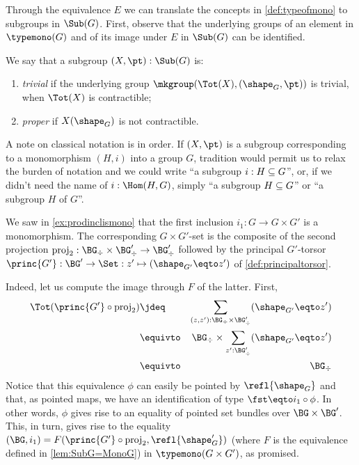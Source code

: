 Through the equivalence $E$ we can translate the concepts in
\cref{def:typeofmono} to subgroups in $\Sub(G)$.  First, observe that the
underlying groups of an element in $\typemono(G)$ and of its image under $E$ in
$\Sub(G)$ can be identified.

\begin{definition}\label{def:triv-proper-Mono}
We say that a subgroup $(X,\pt):\Sub(G)$ is:
\begin{enumerate}
\item \emph{trivial} if the underlying group
  $\mkgroup(\Tot(X),(\sh_G,\pt))$ is trivial, \ie when $\Tot(X)$ is contractible;
\item \emph{proper} if $X(\sh_G)$ is not
  contractible.\qedhere
\end{enumerate}
\end{definition}
      
\begin{remark}\label{rem:notationsubgroup}
  A note on classical notation is in order.  If $(X,\pt)$ is a subgroup
  corresponding to a monomorphism $(H,i)$ into a group $G$, tradition would
  permit us to relax the burden of notation and we could write ``a subgroup
  $i:H\subseteq G$'', or, if we didn't need the name of $i:\Hom(H,G)$, simply
  ``a subgroup $H\subseteq G$'' or ``a subgroup $H$ of $G$''.
    \end{remark}
    
\begin{example}
  \label{ex:prodinclisGset}
  We saw in \cref{ex:prodinclismono} that the first 
  inclusion $i_1:G\to G\times G'$ is a monomorphism.
  The corresponding $G\times G'$-set is the composite of the second projection
  $\mathrm{proj}_2:\BG_\div\times\BG'_\div\to \BG'_\div$ followed by the
  principal $G'$-torsor $\princ {G'}:\BG'\to\Set: z'\mapsto (\sh_{G'}\eqto z')$ 
  of \cref{def:principaltorsor}.

  Indeed, let us compute the image through $F$ of the latter. First,
  \begin{eqnarray*}
    \Tot(\princ {G'}\circ \mathrm{proj}_2)
    & \jdeq & \sum_{(z,z') : \BG_\div\times\BG'_\div}(\sh_{G'}\eqto z') \\
    & \equivto & \BG_\div \times \sum_{z' : \BG'_\div}(\sh_{G'}\eqto z') \\
    & \equivto & \BG_\div
  \end{eqnarray*}
  Notice that this equivalence $\phi$ can easily be pointed by $\refl{\sh_G}$
  and that, as pointed maps, we have an identification of type
  $\fst \eqto i_1 \circ \phi$. In other words, $\phi$ gives rise to an equality
  of pointed set bundles over $\BG\times\BG'$. This, in turn, gives rise to the
  equality $(\BG, i_1) = F(\princ {G'}\circ \mathrm{proj}_2, \refl{\sh_G'})$
  (where $F$ is the equivalence defined in \cref{lem:SubG=MonoG}) in
  $\typemono(G\times G')$, as promised.
\end{example}
    
